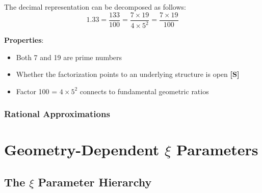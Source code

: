 	The decimal representation can be decomposed as follows:
	\begin{equation}
		1.33 = \frac{133}{100} = \frac{7 \times 19}{4 \times 5^2} = \frac{7 \times 19}{100}
		\label{eq:factorization}
	\end{equation}
	
	\textbf{Properties}:
	\begin{itemize}
		\item Both 7 and 19 are prime numbers
		\item Whether the factorization points to an underlying structure is open \textbf{[S]}
		\item Factor 100 = $4 \times 5^2$ connects to fundamental geometric ratios
	\end{itemize}
	
	\subsubsection{Rational Approximations}
	\label{subsubsec:rational_approximations}
	
	\begin{table}[htbp]
		\centering
		\caption{Rational approximations to $\xi$ coefficient}
		\label{tab:rational_approximations}
	\end{table}
	
	\section{Geometry-Dependent \texorpdfstring{$\xi$}{xi} Parameters}
	\label{sec:geometry_dependent_xi}
	
	\subsection{The \texorpdfstring{$\xi$}{xi} Parameter Hierarchy}
	\label{subsec:xi_hierarchy}
	
